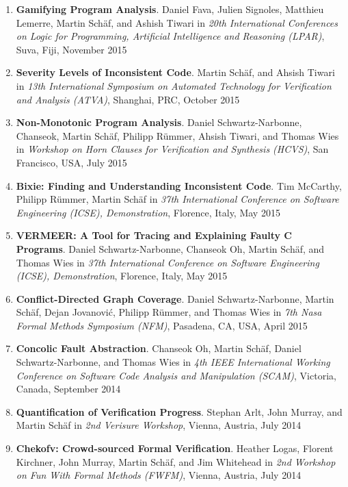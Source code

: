 \begin{enumerate}
\item \textbf{Gamifying Program Analysis}.
Daniel Fava, Julien Signoles, Matthieu Lemerre, Martin Sch\"af, and Ashish Tiwari
in \emph{20th International Conferences on Logic for Programming, Artificial Intelligence and Reasoning (LPAR)}, Suva, Fiji, November
2015

\item \textbf{Severity Levels of Inconsistent Code}.
Martin Sch\"af, and Ahsish Tiwari in \emph{13th International
Symposium on Automated Technology for Verification and Analysis (ATVA)},
Shanghai, PRC, October 2015

\item \textbf{Non-Monotonic Program Analysis}.
Daniel Schwartz-Narbonne, Chanseok, Martin Sch\"af, Philipp R\"ummer, Ahsish
Tiwari, and Thomas Wies in \emph{Workshop on Horn Clauses for Verification and
Synthesis (HCVS)}, San Francisco, USA, July 2015


\item \textbf{Bixie: Finding and Understanding Inconsistent Code}.
Tim McCarthy, Philipp R\"ummer, Martin Sch\"af 
in \emph{37th International Conference on Software Engineering (ICSE),
Demonstration}, Florence, Italy, May 2015


\item \textbf{VERMEER: A Tool for Tracing and Explaining Faulty C Programs}.
Daniel Schwartz-Narbonne, Chanseok Oh, Martin Sch\"af, and Thomas Wies 
in \emph{37th International Conference on Software Engineering (ICSE),
Demonstration}, Florence, Italy, May 2015


\item \textbf{Conflict-Directed Graph Coverage}.
Daniel Schwartz-Narbonne, Martin Sch\"af, Dejan Jovanovi\'c, Philipp R\"ummer,
and Thomas Wies in \emph{7th Nasa Formal
Methods Symposium (NFM)}, Pasadena, CA, USA, April 2015


\item \textbf{Concolic Fault Abstraction}.  
Chanseok Oh, Martin Sch\"af, Daniel Schwartz-Narbonne, and Thomas Wies in
\emph{4th IEEE International Working Conference on Software Code Analysis and
Manipulation (SCAM)}, Victoria, Canada, September 2014

\item \textbf{Quantification of Verification Progress}.
Stephan Arlt, John Murray, and Martin Sch\"af in \emph{2nd Verisure Workshop},
Vienna, Austria, July 2014


\item \textbf{Chekofv: Crowd-sourced Formal Verification}.
Heather Logas, Florent Kirchner, John Murray, Martin Sch\"af, and Jim Whitehead
in \emph{2nd Workshop on Fun With Formal Methods (FWFM)}, Vienna, Austria, July
2014



\end{enumerate}
